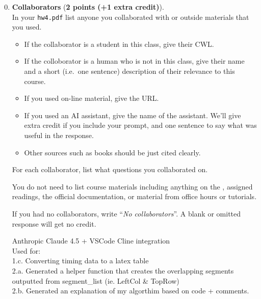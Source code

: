 \documentclass{article}
\newenvironment{answer}
{\par\color{blue}}
{\normalfont\par}
\begin{document}
\begin{enumerate}\setcounter{enumi}{-1}
    \item \textbf{Collaborators} (\textbf{2 points (+1 extra credit)}).\label{q:collab}\\
          In your \texttt{hw4.pdf} list anyone you collaborated with or outside materials that you used.
          \begin{itemize}
              \item If the collaborator is a student in this class, give their CWL.
              \item If the colloborator is a human who is not in this class, give their name
                    and a short (i.e.\ one sentence) description of their relevance to this course.
              \item If you used on-line material, give the URL.
              \item If you used an AI assistant, give the name of the assistant.
                    We'll give extra credit if you include your prompt, and one sentence to say
                    what was useful in the response.
              \item Other sources such as books should be just cited clearly.
          \end{itemize}
          For each collaborator, list what questions you collaborated on.
          \par
          You do not need to list course materials including anything on the
          ,
          assigned readings, the official  documentation,
          or material from office hours or tutorials.
          \par
          If you had no collaborators, write ``\textit{No collaborators}''.
          A blank or omitted response will get no credit.
          \begin{answer}
              Anthropic Claude 4.5 + VSCode Cline integration \\
              Used for: \\
              1.c. Converting timing data to a latex table \\
              2.a. Generated a helper function that creates the
              overlapping segments outputted from segment\_list (ie. LeftCol \& TopRow) \\
              2.b. Generated an explanation of my algorthim based on code + comments. \\

\end{answer}
\end{enumerate}
\end{document}
